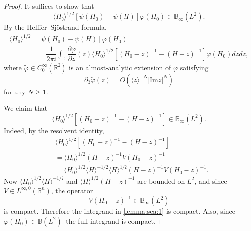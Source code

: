 \documentclass[11pt,a4paper]{article}
\numberwithin{equation}{section}
\begin{document}
\begin{proof}
It suffices to show that
\[
\langle H_{0} \rangle^{1/2} [ \psi(H_{0}) - \psi(H)]\varphi(H_{0}) \in \mathbb{B}_{\infty}(L^{2}).
\]
By the Helffer--Sj\"ostrand formula,
\begin{equation}\label{lemma:sca:1}
\begin{aligned}
\langle H_{0} \rangle^{1/2} &[ \psi(H_{0}) - \psi(H)]\varphi(H_{0}) \\
&= \dfrac{1}{2\pi i}\int_{\mathbb{C}}\dfrac{\partial \tilde{\varphi} }{\partial \bar{z} } (z) \langle H_{0} \rangle^{1/2} [ (H_{0} - z)^{-1} - (H - z)^{-1} ]\varphi(H_{0})dz d\bar{z},
\end{aligned}
\end{equation}
where $\tilde{\varphi} \in C_{0}^{\infty}(\mathbb{R}^{2})$ is an almost-analytic extension of $\varphi$ satisfying
\[
\partial_{\bar{z}}\tilde{\varphi}(z) = O(\langle z \rangle^{-N}|\text{Im}z|^{N})
\]
for any $N \geq 1$.

We claim that
\[
\langle H_{0} \rangle^{1/2} [ (H_{0} - z)^{-1} - (H - z)^{-1} ] \in \mathbb{B}_{\infty}(L^2).
\]
Indeed, by the resolvent identity,
\begin{align*}
&\langle H_{0} \rangle^{1/2} [ (H_{0} - z)^{-1} - (H - z)^{-1} ] \\
&= \langle H_{0} \rangle^{1/2} (H - z)^{-1}V(H_{0} - z)^{-1} \\
&= \langle H_{0} \rangle^{1/2} \langle H \rangle^{-1/2} \langle H \rangle^{1/2} (H - z)^{-1}V(H_{0} - z)^{-1}.
\end{align*}
Now $\langle H_{0} \rangle^{1/2} \langle H \rangle^{-1/2}$ and $\langle H \rangle^{1/2} (H - z)^{-1}$ are bounded on $L^{2}$, and since $V \in L^{\infty,0}(\mathbb{R}^{n})$, the operator
\[
V(H_{0} - z)^{-1} \in \mathbb{B}_{\infty}(L^{2})
\]
is compact. Therefore the integrand in \eqref{lemma:sca:1} is compact. Also, since $\varphi(H_{0}) \in \mathbb{B}(L^{2})$, the full integrand is compact.


\end{proof}
\end{document}
